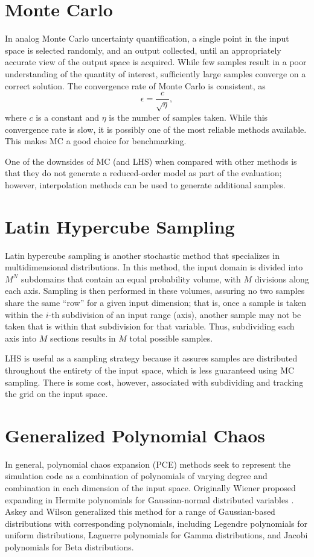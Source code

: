 \section{Monte Carlo}
In analog Monte Carlo uncertainty quantification, a single point in the input space is selected randomly,
and an output collected, until an appropriately accurate view of the output space is acquired.  While few
samples result in a poor understanding of the quantity of interest, sufficiently large samples converge on a
correct solution.  The convergence rate of Monte Carlo is consistent, as
\begin{equation}
  \epsilon = \frac{c}{\sqrt{\eta}},
\end{equation}
where $c$ is a constant and $\eta$ is the number of samples taken.  While this convergence rate is slow, it is possibly one of the
most reliable methods available.  This makes MC a good choice for benchmarking.

One of the downsides of MC (and LHS) when compared with other methods is that they do not generate a
reduced-order model as part of the evaluation; however, interpolation methods can be used to generate
additional samples.

\section{Latin Hypercube Sampling}
Latin hypercube sampling\cite{lhs} is another stochastic method that specializes in multidimensional
distributions.  In this method, the input domain is divided into $M^N$ subdomains that contain an equal
probability volume, with $M$ divisions along each axis.  Sampling is then performed in these volumes, assuring
no two samples share the same ``row'' for a given input dimension; that is, once a sample is taken within the
$i$-th subdivision of an input range (axis), another sample may not be taken that is within that subdivision
for that variable.  Thus, subdividing each axis into $M$ sections results in $M$ total possible samples.

LHS is useful as a sampling strategy because it assures samples are distributed throughout the entirety of the
input space, which is less guaranteed using MC sampling.  There is some cost, however, associated with
subdividing and tracking the grid on the input space.



\section{Generalized Polynomial Chaos}
In general, polynomial chaos expansion (PCE) methods seek to represent the simulation code as a combination of
polynomials of varying degree and combination in each dimension of the input space.  Originally Wiener
proposed expanding in Hermite polynomials for Gaussian-normal distributed variables \cite{wiener}.  Askey and
Wilson generalized this method for a range of Gaussian-based distributions with corresponding polynomials,
including Legendre polynomials for uniform distributions, Laguerre polynomials for Gamma distributions, and
Jacobi polynomials for Beta distributions\cite{Wiener-Askey}.

